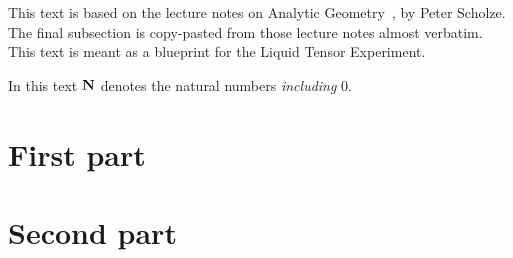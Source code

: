 \maketitle

\begin{remark}
	This text is based on the lecture notes on Analytic Geometry~\cite{Analytic},
	by Peter Scholze.
  The final subsection is copy-pasted from those lecture notes almost verbatim.
  This text is meant as a blueprint for the Liquid Tensor Experiment.
\end{remark}

\begin{remark}
  In this text $\mathbf{N}$ denotes the natural numbers \emph{including} $0$.
\end{remark}



\section{First part}
\label{cha:one}









\section{Second part}
\label{cha:two}







